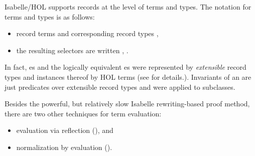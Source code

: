 \begin{isabellebody}
\begin{isamarkuptext}
\vspace{-0.1cm} \noindent Isabelle/HOL supports records at the level of terms and 
types. The notation for terms and types is as follows: \vspace{-0.2cm}

%
\begin{itemize}%
\item record terms  and corresponding record types ,

\item the resulting selectors are written , .%
\end{itemize}
\end{isamarkuptext}\isamarkuptrue%

\begin{isamarkuptext}
\noindent In fact, es and the logically equivalent  es were
represented by \emph{extensible} record types and instances thereof by HOL terms 
(see \cite{brucker.ea:isabelledof:2019} for details.).  
Invariants of an  are just predicates over extensible record
types and were applied to subclasses.
\end{isamarkuptext}\isamarkuptrue%
%
\isadelimdocument
%
\endisadelimdocument
%
\isatagdocument
%
\isamarkuptrue%
%
\endisatagdocument
{\isafolddocument}%
%
\isadelimdocument
%
\endisadelimdocument

\begin{isamarkuptext}
Besides the powerful, but relatively slow Isabelle rewriting-based proof method,
there are  two other techniques for term evaluation: \vspace{-0.2cm}

%
\begin{itemize}%
\item evaluation via reflection \cite{HaftmannN10} (), and

\item normalization by evaluation \cite{AehligHN12} ().%
\end{itemize}
\end{isamarkuptext}\isamarkuptrue%


\end{isabellebody}

